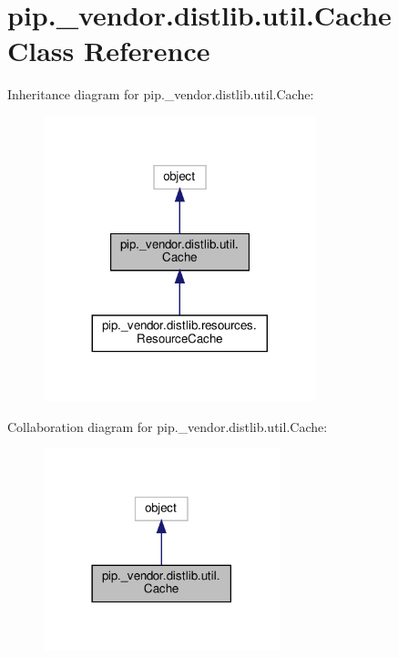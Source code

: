 \hypertarget{classpip_1_1__vendor_1_1distlib_1_1util_1_1Cache}{}\section{pip.\+\_\+vendor.\+distlib.\+util.\+Cache Class Reference}
\label{classpip_1_1__vendor_1_1distlib_1_1util_1_1Cache}


Inheritance diagram for pip.\+\_\+vendor.\+distlib.\+util.\+Cache\+:
\nopagebreak
\begin{figure}[H]
\begin{center}
\leavevmode
\includegraphics[width=224pt]{classpip_1_1__vendor_1_1distlib_1_1util_1_1Cache__inherit__graph}
\end{center}
\end{figure}


Collaboration diagram for pip.\+\_\+vendor.\+distlib.\+util.\+Cache\+:
\nopagebreak
\begin{figure}[H]
\begin{center}
\leavevmode
\includegraphics[width=194pt]{classpip_1_1__vendor_1_1distlib_1_1util_1_1Cache__coll__graph}
\end{center}
\end{figure}
